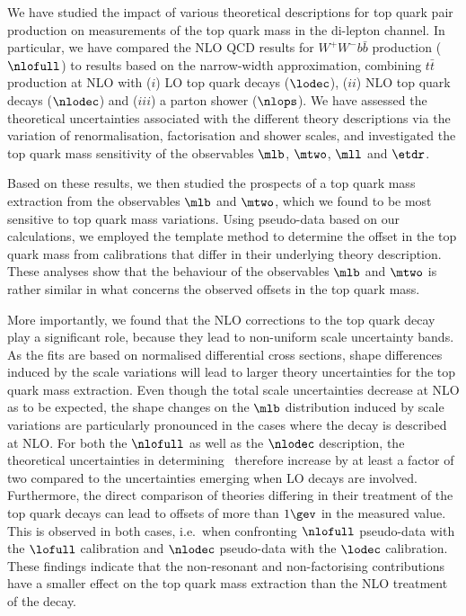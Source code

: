 We have studied the impact of various theoretical descriptions for top
quark pair production on measurements of the top quark mass in the
di-lepton channel. In particular, we have compared the NLO QCD results
for $W^+W^- b\bar{b}$ production ($\nlofull$) to results based on the narrow-width
approximation, combining $t\bar{t}$ production at NLO with ($i$) LO top
quark decays ($\lodec$), ($ii$) NLO top quark decays
($\nlodec$) and ($iii$) a parton shower ($\nlops$). 
%
We have assessed the theoretical uncertainties associated with the
different theory descriptions via the variation of renormalisation,
factorisation and shower scales, and investigated the top quark mass
sensitivity of the observables $\mlb$, $\mtwo$, $\mll$ and $\etdr$.

Based on these results, we then studied the prospects of a top quark
mass extraction from the observables $\mlb$ and $\mtwo$, which we
found to be most sensitive to top quark mass variations.
Using pseudo-data based on our calculations, we employed the template
method to determine the offset in the top quark mass from calibrations
that differ in their underlying theory description. These analyses
show that the behaviour of the observables $\mlb$ and $\mtwo$ is
rather similar in what concerns the observed offsets in the top quark
mass.

More importantly, we found that the NLO corrections to the top quark decay
play a significant role, because they lead to non-uniform scale
uncertainty bands.
%
As the fits are based on normalised differential cross sections, 
shape differences induced by the scale variations will 
lead to larger theory uncertainties for the top quark mass extraction.
%
Even though the total scale uncertainties decrease at NLO as to be expected, 
the shape changes on the $\mlb$ distribution induced by scale variations are
particularly pronounced in the cases where the decay is described at NLO.
%
For both the $\nlofull$ as well as the $\nlodec$ description, the theoretical
uncertainties in determining \mt\ therefore increase by at least a
factor of two compared to the uncertainties emerging when LO decays are
involved.
%
Furthermore, the direct comparison of theories differing in their treatment
of the top quark decays can lead to offsets of more than $1\gev$ in the
measured \mt value.
%
This is observed in both cases, i.e.~when confronting $\nlofull$ pseudo-data
with the $\lofull$ calibration and $\nlodec$ pseudo-data with the $\lodec$
calibration.
%
These findings indicate that the non-resonant and non-factorising contributions
have a smaller effect on the top quark mass extraction than the NLO treatment
of the decay.

